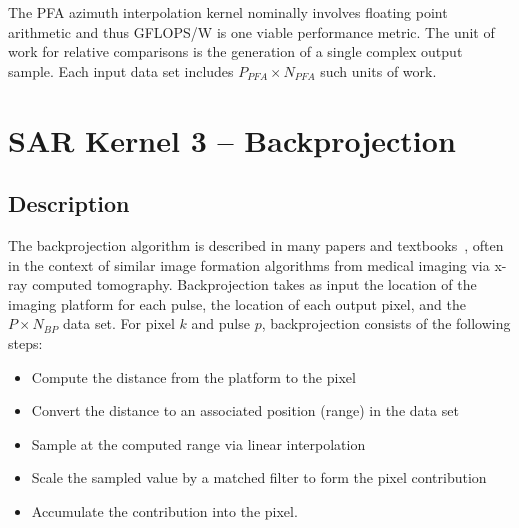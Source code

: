 \documentclass{report}
\begin{document}
The PFA azimuth interpolation kernel nominally involves floating point arithmetic
and thus GFLOPS/W is one viable performance metric.
The unit of work for relative comparisons is the generation of a single complex
output sample.
Each input data set includes $P_{PFA} \times N_{PFA}$ such units of work.


\section{SAR Kernel 3 -- Backprojection}

\subsection{Description}

The backprojection algorithm is described in many papers and
textbooks~\cite{GorhamSPIE2010,MunsonIEEE1983,DesaiTIP1992},
often in the context of similar image formation algorithms from medical
imaging via x-ray computed tomography.
Backprojection takes as input the location of the imaging platform for
each pulse, the location of each output pixel, and the $P \times N_{BP}$
data set.
For pixel $k$ and pulse $p$, backprojection consists of the following
steps:
\begin{itemize}
    \item Compute the distance from the platform to the pixel
    \item Convert the distance to an associated position (range) in the data set
    \item Sample at the computed range via linear interpolation
    \item Scale the sampled value by a matched filter to form the pixel contribution
    \item Accumulate the contribution into the pixel.
\end{itemize}
\end{document}
